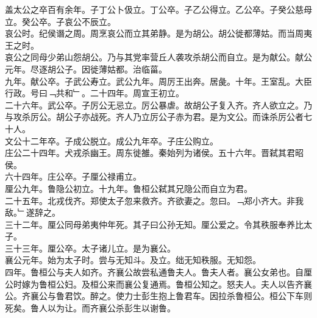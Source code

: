 \documentclass{zhvt-classic}
\begin{document}
\hspace*{2em}盖太公之卒百有余年。子丁公卜伋立。丁公卒。子乙公得立。乙公卒。子癸公慈母立。癸公卒。子哀公不辰立。\\
\hspace*{2em}哀公时。纪侯谮之周。周烹哀公而立其弟静。是为胡公。胡公徙都薄姑。而当周夷王之时。\\
\hspace*{2em}哀公之同母少弟山怨胡公。乃与其党率营丘人袭攻杀胡公而自立。是为献公。献公元年。尽逐胡公子。因徙薄姑都。治临菑。\\
\hspace*{2em}九年。献公卒。子武公寿立。武公九年。周厉王出奔。居彘。十年。王室乱。大臣行政。号曰﹁共和﹂。二十四年。周宣王初立。\\
\hspace*{2em}二十六年。武公卒。子厉公无忌立。厉公暴虐。故胡公子复入齐。齐人欲立之。乃与攻杀厉公。胡公子亦战死。齐人乃立厉公子赤为君。是为文公。而诛杀厉公者七十人。\\
\hspace*{2em}文公十二年卒。子成公脱立。成公九年卒。子庄公购立。\\
\hspace*{2em}庄公二十四年。犬戎杀幽王。周东徙雒。秦始列为诸侯。五十六年。晋弑其君昭侯。\\
\hspace*{2em}六十四年。庄公卒。子厘公禄甫立。\\
\hspace*{2em}厘公九年。鲁隐公初立。十九年。鲁桓公弑其兄隐公而自立为君。\\
\hspace*{2em}二十五年。北戎伐齐。郑使太子忽来救齐。齐欲妻之。忽曰。﹁郑小齐大。非我敌。﹂遂辞之。\\
\hspace*{2em}三十二年。厘公同母弟夷仲年死。其子曰公孙无知。厘公爱之。令其秩服奉养比太子。\\
\hspace*{2em}三十三年。厘公卒。太子诸儿立。是为襄公。\\
\hspace*{2em}襄公元年。始为太子时。尝与无知斗。及立。绌无知秩服。无知怨。\\
\hspace*{2em}四年。鲁桓公与夫人如齐。齐襄公故尝私通鲁夫人。鲁夫人者。襄公女弟也。自厘公时嫁为鲁桓公妇。及桓公来而襄公复通焉。鲁桓公知之。怒夫人。夫人以告齐襄公。齐襄公与鲁君饮。醉之。使力士彭生抱上鲁君车。因拉杀鲁桓公。桓公下车则死矣。鲁人以为让。而齐襄公杀彭生以谢鲁。\\
\end{document}
